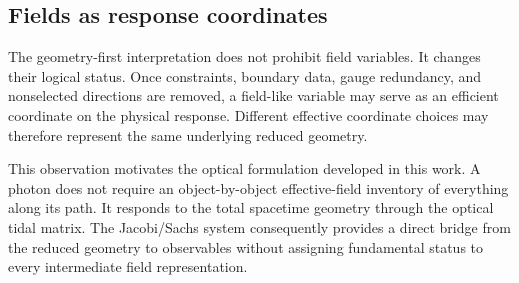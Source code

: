 \subsection{Fields as response coordinates}

The geometry-first interpretation does not prohibit field variables.  It
changes their logical status.  Once constraints, boundary data, gauge
redundancy, and nonselected directions are removed, a field-like variable may
serve as an efficient coordinate on the physical response.  Different
effective coordinate choices may therefore represent the same underlying
reduced geometry.

This observation motivates the optical formulation developed in this work.
A photon does not require an object-by-object effective-field inventory of
everything along its path.  It responds to the total spacetime geometry
through the optical tidal matrix.  The Jacobi/Sachs system consequently
provides a direct bridge from the reduced geometry to observables without
assigning fundamental status to every intermediate field representation.
